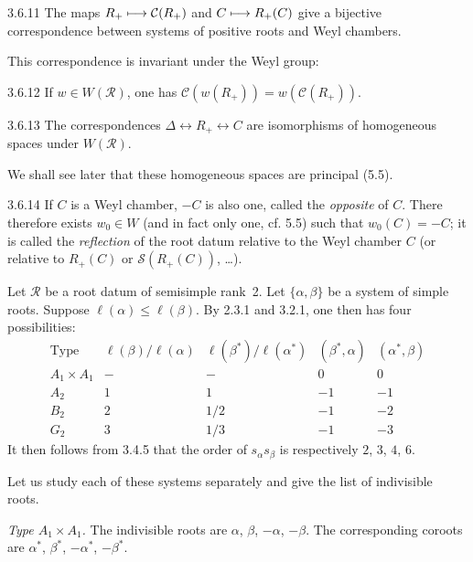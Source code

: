 \begin{corollary}{3.6.11}\label{XXI.3.6.11}
The maps $R_+\longmapsto\mathcal C(R_+)$ and $C\longmapsto R_+(C)$ give a bijective correspondence between systems of positive roots and Weyl chambers.
\end{corollary}
This correspondence is invariant under the Weyl group:
\begin{lemma}{3.6.12}\label{XXI.3.6.12}
If $w\in W(\mathcal R)$, one has $\mathcal C(w(R_+))=w(\mathcal C(R_+))$.
\end{lemma}
\begin{corollary}{3.6.13}\label{XXI.3.6.13}
The correspondences $\Delta\leftrightarrow R_+\leftrightarrow C$ are isomorphisms of homogeneous spaces under $W(\mathcal R)$.
\end{corollary}
We shall see later that these homogeneous spaces are principal (5.5).
\begin{remark}{3.6.14}\label{XXI.3.6.14}
If $C$ is a Weyl chamber, $-C$ is also one, called the \emph{opposite} of $C$. There therefore exists $w_0\in W$ (and in fact only one, cf. 5.5) such that $w_0(C)=-C$; it is called the \emph{reflection} of the root datum relative to the Weyl chamber $C$ (or relative to $R_+(C)$ or $\mathcal S(R_+(C))$, \ldots).
\end{remark}

\label{XXI.sec.4}
 {\renewcommand{\thefootnote}{(16)}}%
Let $\mathcal R$ be a root datum of semisimple rank~2. Let $\{\alpha,\beta\}$ be a system of simple roots. Suppose $\ell(\alpha)\leq\ell(\beta)$. By 2.3.1 and 3.2.1, one then has four possibilities:
\[
\begin{array}{c|cccc}
\text{Type}&\ell(\beta)/\ell(\alpha)&\ell(\beta^*)/\ell(\alpha^*)&(\beta^*,\alpha)&(\alpha^*,\beta)\\\hline
A_1\times A_1&-&-&0&0\\
A_2&1&1&-1&-1\\
B_2&2&1/2&-1&-2\\
G_2&3&1/3&-1&-3
\end{array}
\]
It then follows from 3.4.5 that the order of $s_\alpha s_\beta$ is respectively $2$, $3$, $4$, $6$.

Let us study each of these systems separately and give the list of indivisible roots.

\emph{Type $A_1\times A_1$.} The indivisible roots are $\alpha$, $\beta$, $-\alpha$, $-\beta$. The corresponding coroots are $\alpha^*$, $\beta^*$, $-\alpha^*$, $-\beta^*$.

